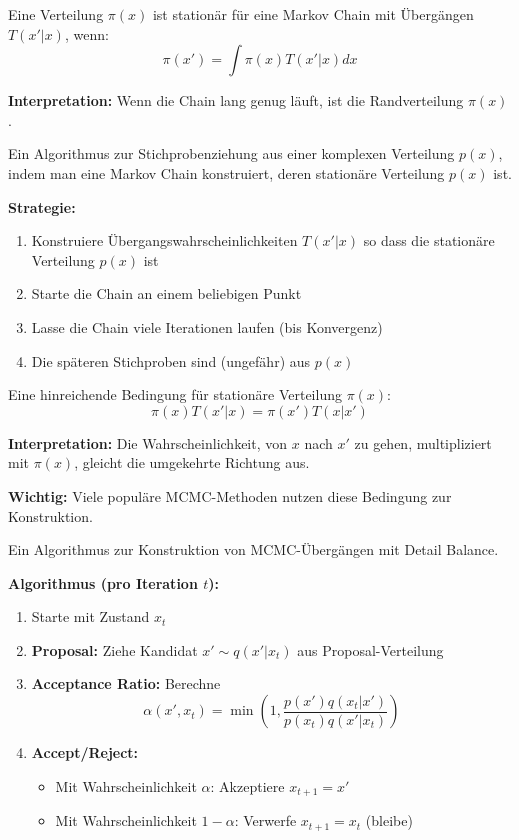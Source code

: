Eine Verteilung $\pi(x)$ ist stationär für eine Markov Chain mit Übergängen $T(x' | x)$, wenn:
$$\pi(x') = \int \pi(x) T(x' | x) dx$$

\textbf{Interpretation:} Wenn die Chain lang genug läuft, ist die Randverteilung $\pi(x)$.

Ein Algorithmus zur Stichprobenziehung aus einer komplexen Verteilung $p(x)$, indem man eine Markov Chain konstruiert, deren stationäre Verteilung $p(x)$ ist.

\textbf{Strategie:}
\begin{enumerate}[leftmargin=1.5em]
    \item Konstruiere Übergangswahrscheinlichkeiten $T(x' | x)$ so dass die stationäre Verteilung $p(x)$ ist
    \item Starte die Chain an einem beliebigen Punkt
    \item Lasse die Chain viele Iterationen laufen (bis Konvergenz)
    \item Die späteren Stichproben sind (ungefähr) aus $p(x)$
\end{enumerate}

Eine hinreichende Bedingung für stationäre Verteilung $\pi(x)$:
$$\pi(x) T(x' | x) = \pi(x') T(x | x')$$

\textbf{Interpretation:} Die Wahrscheinlichkeit, von $x$ nach $x'$ zu gehen, multipliziert mit $\pi(x)$, gleicht die umgekehrte Richtung aus.

\textbf{Wichtig:} Viele populäre MCMC-Methoden nutzen diese Bedingung zur Konstruktion.

Ein Algorithmus zur Konstruktion von MCMC-Übergängen mit Detail Balance.

\textbf{Algorithmus (pro Iteration $t$):}

\begin{enumerate}[leftmargin=1.5em]
    \item Starte mit Zustand $x_t$
    \item \textbf{Proposal:} Ziehe Kandidat $x' \sim q(x' | x_t)$ aus Proposal-Verteilung
    \item \textbf{Acceptance Ratio:} Berechne
    $$\alpha(x', x_t) = \min\left(1, \frac{p(x') q(x_t | x')}{p(x_t) q(x' | x_t)}\right)$$
    \item \textbf{Accept/Reject:} 
    \begin{itemize}[leftmargin=1.5em]
        \item Mit Wahrscheinlichkeit $\alpha$: Akzeptiere $x_{t+1} = x'$
        \item Mit Wahrscheinlichkeit $1 - \alpha$: Verwerfe $x_{t+1} = x_t$ (bleibe)
    \end{itemize}
\end{enumerate}

